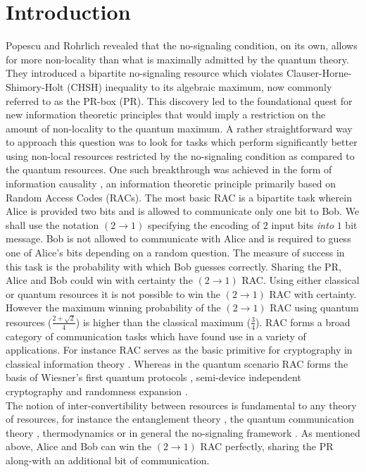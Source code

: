 \documentclass[%
 reprint,
 amsmath,amssymb,
 aps,
]{revtex4-1}
\begin{document}
\section{Introduction}
\noindent Popescu and Rohrlich \cite{popescu1994quantum} revealed that the no-signaling condition, on its own, allows for more non-locality than what is maximally admitted by the quantum theory. They introduced a bipartite no-signaling resource which violates Clauser-Horne-Shimory-Holt (CHSH) inequality to its algebraic maximum, now commonly referred to as the PR-box (PR). This discovery led to the foundational quest for new information theoretic principles that would imply a restriction on the amount of non-locality to the quantum maximum. A rather straightforward way to approach this question was to look for tasks which perform significantly better using non-local resources restricted by the no-signaling condition as compared to the quantum resources. One such breakthrough was achieved in the form of information causality \cite{pawlowski2009information}, an information theoretic principle primarily based on Random Access Codes (RACs). The most basic RAC is a bipartite task wherein Alice is provided two bits and is allowed to communicate only one bit to Bob. We shall use the notation $(2\rightarrow1)$ specifying the encoding of $2$ input bits \textit{into} $1$ bit message. Bob is not allowed to communicate with Alice and is required to guess one of Alice's bits depending on a random question. The measure of success in this task is the probability with which Bob guesses correctly. Sharing the PR, Alice and Bob could win with certainty the $(2 \rightarrow 1)$ RAC. Using either classical or quantum resources it is not possible to win the $(2 \rightarrow 1)$ RAC with certainty. However the maximum winning probability of the $(2 \rightarrow 1)$ RAC using quantum resources ($\frac{2+\sqrt{2}}{4}$) is higher than the classical maximum ($\frac{3}{4}$). RAC forms a broad category of communication tasks which have found use in a variety of applications. For instance RAC serves as the basic primitive for cryptography in classical information theory \citep{kilian1988founding,crepeau1988achieving}. Whereas in the quantum scenario RAC forms the basis of Wiesner's first quantum protocols \cite{wiesner1983conjugate,ambainis2002dense}, semi-device independent cryptography \cite{pawlowski2011semi,chaturvedi2015security} and randomness expansion \cite{li2011semi,li2012semi}. \\
The notion of inter-convertibility between resources is fundamental to any theory of resources, for instance the entanglement theory  \cite{bennett1996concentrating,horodecki2002laws,brandao2008entanglement}, the quantum communication theory \cite{abeyesinghe2009mother}, thermodynamics \cite{janzing2000thermodynamic,horodecki2013fundamental,brandao2013resource} or in general the no-signaling framework \cite{allcock2009closed,brunner2011bound}. As mentioned above, Alice and Bob can win the $(2\rightarrow1)$ RAC perfectly, sharing the PR along-with an additional bit of communication.  
\end{document}
